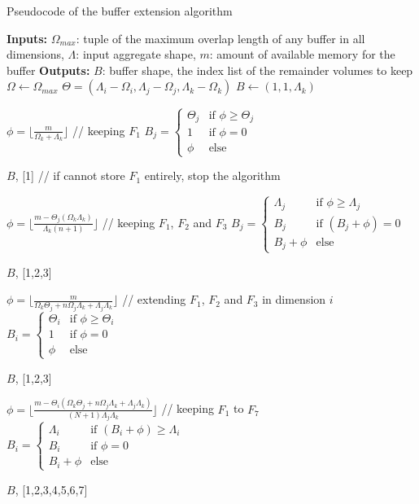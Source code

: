 \documentclass[conference]{IEEEtran}
\begin{document}
\begin{algorithm}
  \caption{Pseudocode of the buffer extension algorithm}
  \label{algo:bufferextensionalgorihm}
  \begin{algorithmic}[1]
    \STATE \textbf{Inputs:} $\Omega_{max}$: tuple of the maximum overlap length
    of any buffer in all dimensions, $\Lambda$: input aggregate shape,
    $m$: amount of available memory for the buffer
    \STATE \textbf{Outputs:} $B$: buffer shape, the index list of the remainder volumes to keep
    \STATE $\Omega \leftarrow \Omega_{max}$
    \STATE $\Theta = (\Lambda_i - \Omega_i, \Lambda_j - \Omega_j, \Lambda_k - \Omega_k)$
    \STATE $B \leftarrow (1,1,\Lambda_k)$

    \STATE $\phi = \lfloor \frac{m}{\Omega_k + \Lambda_k} \rfloor$ // keeping $F_1$
    \STATE $B_j = \begin{cases}
      \Theta_j & \textrm{if }\phi \geq \Theta_j \\
      1 & \textrm{if }\phi = 0 \\
      \phi & \textrm{else}
    \end{cases}$

      \RETURN $B$, [1] // if cannot store $F_1$ entirely, stop the algorithm
    \ENDIF

    \STATE $\phi = \lfloor \frac{m-\Theta_j(\Omega_k\Lambda_k)}{\Lambda_k(n+1)} \rfloor$  // keeping $F_1$, $F_2$ and $F_3$
    \STATE $B_j = \begin{cases}
      \Lambda_j & \textrm{if }\phi \geq \Lambda_j \\
      B_j & \textrm{if }(B_j+\phi) = 0 \\
      B_j + \phi & \textrm{else}
    \end{cases}$

      \RETURN $B$, [1,2,3]
    \ENDIF

    \STATE $\phi = \lfloor \frac{m}{\Omega_k\Theta_j + n\Omega_j\Lambda_k + \Lambda_j\Lambda_k} \rfloor$ // extending $F_1$, $F_2$ and $F_3$ in dimension $i$
    \STATE $B_i = \begin{cases}
      \Theta_i & \textrm{if }\phi \geq \Theta_i \\
      1 & \textrm{if }\phi = 0 \\
      \phi & \textrm{else}
    \end{cases}$

      \RETURN $B$, [1,2,3]
    \ENDIF

    \STATE $\phi = \lfloor \frac{m-\Theta_i(\Omega_k\Theta_j + n\Omega_j\Lambda_k + \Lambda_j\Lambda_k)}{(N+1)\Lambda_j\Lambda_k} \rfloor$ // keeping $F_1$ to $F_7$
    \STATE $B_i = \begin{cases}
      \Lambda_i & \textrm{if }(B_i+\phi) \geq \Lambda_i \\
      B_i & \textrm{if }\phi = 0 \\
      B_i+\phi & \textrm{else}
    \end{cases}$

    \RETURN $B$, [1,2,3,4,5,6,7]

  \end{algorithmic}
\end{algorithm}
\end{document}
